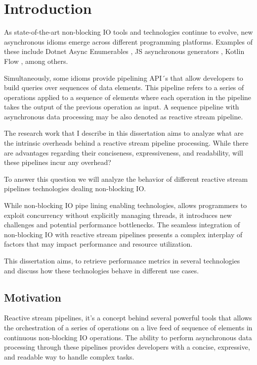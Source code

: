 % 
%  
%
\chapter{Introduction}
\label{cha:introduction}


As state-of-the-art non-blocking IO tools and technologies continue to evolve, new asynchronous idioms emerge across different programming platforms. Examples of these include Dotnet Async Enumerables \cite{DOTNET_ASYNC_ENUM}, JS asynchronous generators \cite{JS_ASYNC_GENERATOR}, Kotlin Flow \cite{KOTLIN_FLOW}, among others.

Simultaneously, some idioms provide pipelining API´s \cite{FOWLER} that allow developers to build queries over sequences of data elements. This pipeline refers to a series of operations applied to a sequence of elements where each operation in the pipeline takes the output of the previous operation as input. A sequence pipeline with asynchronous data processing may be also denoted as reactive stream pipeline.

The research work that I describe in this dissertation aims to analyze what are the intrinsic overheads behind a reactive stream pipeline processing. While there are advantages regarding their conciseness, expressiveness, and readability, will these pipelines incur any overhead?

To answer this question we will analyze the behavior of different reactive stream pipelines technologies dealing non-blocking IO.

While non-blocking IO pipe lining enabling technologies, allows programmers to exploit concurrency without explicitly managing threads, it introduces new challenges and potential performance bottlenecks. The seamless integration of non-blocking IO with reactive stream pipelines presents a complex interplay of factors that may impact performance and resource utilization. 

This dissertation aims, to retrieve performance metrics in several technologies and discuss how these technologies behave in different use cases.

\section{Motivation}
\label{sec:motivation}

Reactive stream pipelines, it's a  concept behind several powerful tools that allows the orchestration of a series of operations on a live feed of sequence of elements in continuous non-blocking IO operations. The ability to perform asynchronous data processing through these pipelines provides developers with a concise, expressive, and readable way to handle complex tasks.

